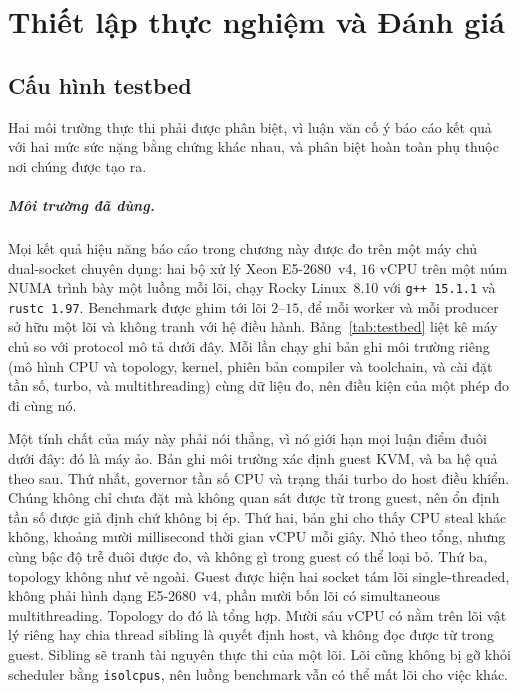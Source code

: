\chapter{Thiết lập thực nghiệm và Đánh giá\label{chapter:eval}}

\section{Cấu hình testbed\label{sec:testbed}}
Hai môi trường thực thi phải được phân biệt, vì luận văn cố ý báo cáo
kết quả với hai mức sức nặng bằng chứng khác nhau, và phân biệt hoàn toàn phụ thuộc nơi
chúng được tạo ra.

\paragraph{Môi trường đã dùng.}
Mọi kết quả hiệu năng báo cáo trong chương này được đo trên một máy chủ dual-socket
chuyên dụng: hai bộ xử lý Xeon E5-2680~v4, $16$ vCPU trên một núm NUMA trình bày một luồng
mỗi lõi, chạy Rocky Linux~8.10 với \texttt{g++~15.1.1} và \texttt{rustc~1.97}. Benchmark
được ghim tới lõi $2$--$15$, để mỗi worker và mỗi producer sở hữu một lõi và
không tranh với hệ điều hành. Bảng~\ref{tab:testbed} liệt kê máy chủ so với
protocol mô tả dưới đây. Mỗi lần chạy ghi bản ghi môi trường riêng (mô hình CPU và topology, kernel, phiên bản compiler và toolchain, và
cài đặt tần số, turbo, và multithreading) cùng dữ liệu đo, nên điều kiện
của một phép đo đi cùng nó.

Một tính chất của máy này phải nói thẳng, vì nó giới hạn mọi luận điểm đuôi dưới đây: đó
là máy ảo. Bản ghi môi trường xác định guest KVM, và ba hệ quả
theo sau. Thứ nhất, governor tần số CPU và trạng thái turbo do host điều khiển. Chúng không
chỉ chưa đặt mà không quan sát được từ trong guest, nên ổn định tần số được giả định chứ không
bị ép. Thứ hai, bản ghi cho thấy CPU steal khác không, khoảng mười millisecond thời gian vCPU
mỗi giây. Nhỏ theo tổng, nhưng cùng bậc độ trễ đuôi được đo, và không gì trong guest có thể loại bỏ. Thứ ba, topology không như vẻ ngoài.
Guest được hiện hai
socket tám lõi single-threaded, không phải hình dạng E5-2680~v4, phần mười bốn lõi
có simultaneous multithreading. Topology do đó là tổng hợp. Mười sáu vCPU có nằm trên lõi vật lý riêng hay chia thread sibling là quyết định host, và
không đọc được từ trong guest. Sibling sẽ tranh tài nguyên thực thi của một lõi.
Lõi cũng không bị gỡ khỏi scheduler bằng
\texttt{isolcpus}, nên luồng benchmark vẫn có thể mất lõi cho việc khác.

